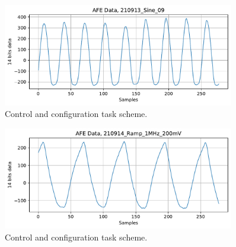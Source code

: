 \begin{figure}[htbp]
\centering %
\includegraphics[width=0.9\textwidth,origin=c,angle=0]{Images/DaphneAFETest/210913_Sine_09.pdf}
\caption{\label{fig:InitPeriTask} Control and configuration task scheme.}
\end{figure}



\begin{figure}[htbp]
\centering %
\includegraphics[width=0.9\textwidth,origin=c,angle=0]{Images/DaphneAFETest/210914_Ramp_1MHz_200mV.pdf}
\caption{\label{fig:InitPeriTask} Control and configuration task scheme.}
\end{figure}

